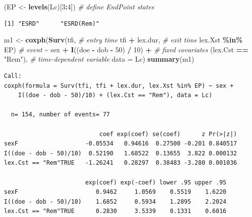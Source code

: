 \documentclass[
]{book}
\newenvironment{Shaded}{\begin{snugshade}}{\end{snugshade}}
\newcommand{\AttributeTok}[1]{\textcolor[rgb]{0.13,0.29,0.53}{#1}}
\newcommand{\CommentTok}[1]{\textcolor[rgb]{0.56,0.35,0.01}{\textit{#1}}}
\newcommand{\DecValTok}[1]{\textcolor[rgb]{0.00,0.00,0.81}{#1}}
\newcommand{\FunctionTok}[1]{\textcolor[rgb]{0.13,0.29,0.53}{\textbf{#1}}}
\newcommand{\NormalTok}[1]{#1}
\newcommand{\OtherTok}[1]{\textcolor[rgb]{0.56,0.35,0.01}{#1}}
\newcommand{\SpecialCharTok}[1]{\textcolor[rgb]{0.81,0.36,0.00}{\textbf{#1}}}
\newcommand{\StringTok}[1]{\textcolor[rgb]{0.31,0.60,0.02}{#1}}
\begin{document}
\begin{enumerate}
\begin{Shaded}
\begin{Highlighting}[]
\NormalTok{(EP }\OtherTok{\textless{}{-}} \FunctionTok{levels}\NormalTok{(Lc)[}\DecValTok{3}\SpecialCharTok{:}\DecValTok{4}\NormalTok{])           }\CommentTok{\# define EndPoint states}
\end{Highlighting}
\end{Shaded}

\begin{verbatim}
[1] "ESRD"      "ESRD(Rem)"
\end{verbatim}

\begin{Shaded}
\begin{Highlighting}[]
\NormalTok{m1 }\OtherTok{\textless{}{-}} \FunctionTok{coxph}\NormalTok{(}\FunctionTok{Surv}\NormalTok{(tfi,             }\CommentTok{\# entry time}
\NormalTok{                 tfi }\SpecialCharTok{+}\NormalTok{ lex.dur,   }\CommentTok{\# exit time}
\NormalTok{                 lex.Xst }\SpecialCharTok{\%in\%}\NormalTok{ EP) }\CommentTok{\# event}
            \SpecialCharTok{\textasciitilde{}}\NormalTok{ sex }\SpecialCharTok{+} \FunctionTok{I}\NormalTok{((doe }\SpecialCharTok{{-}}\NormalTok{ dob }\SpecialCharTok{{-}} \DecValTok{50}\NormalTok{) }\SpecialCharTok{/} \DecValTok{10}\NormalTok{) }\SpecialCharTok{+} \CommentTok{\# fixed covariates}
\NormalTok{              (lex.Cst }\SpecialCharTok{==} \StringTok{"Rem"}\NormalTok{),              }\CommentTok{\# time{-}dependent variable}
            \AttributeTok{data =}\NormalTok{ Lc)}
\FunctionTok{summary}\NormalTok{(m1)}
\end{Highlighting}
\end{Shaded}

\begin{verbatim}
Call:
coxph(formula = Surv(tfi, tfi + lex.dur, lex.Xst %in% EP) ~ sex + 
    I((doe - dob - 50)/10) + (lex.Cst == "Rem"), data = Lc)

  n= 154, number of events= 77 

                           coef exp(coef) se(coef)      z Pr(>|z|)
sexF                   -0.05534   0.94616  0.27500 -0.201 0.840517
I((doe - dob - 50)/10)  0.52190   1.68522  0.13655  3.822 0.000132
lex.Cst == "Rem"TRUE   -1.26241   0.28297  0.38483 -3.280 0.001036

                       exp(coef) exp(-coef) lower .95 upper .95
sexF                      0.9462     1.0569    0.5519    1.6220
I((doe - dob - 50)/10)    1.6852     0.5934    1.2895    2.2024
lex.Cst == "Rem"TRUE      0.2830     3.5339    0.1331    0.6016


\end{verbatim}
\end{enumerate}
\end{document}
